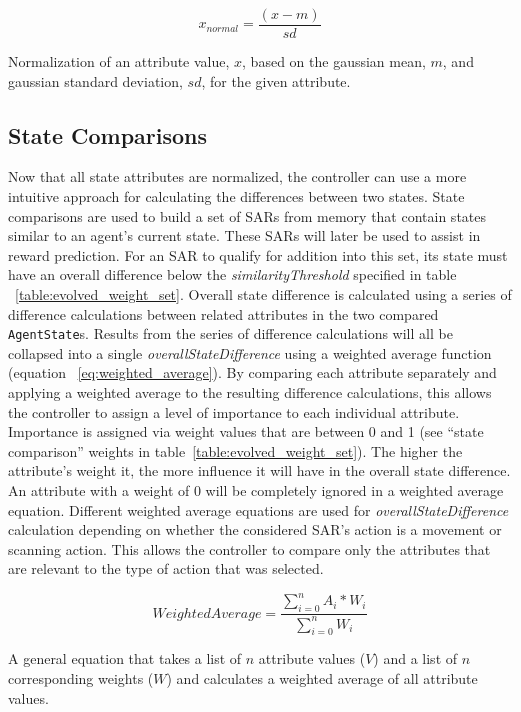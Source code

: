 \begin{capeq}
  \begin{equation} \label{eq:gaussian_normalize}
    x_{normal} = \frac{(x - m)}{sd}
  \end{equation}
  \caption{Normalization of an attribute value, $x$, based on the gaussian mean, $m$, and gaussian standard deviation, $sd$, for the given attribute.}
\end{capeq}



\subsection{State Comparisons} \label{subsec:state_comparisons}
Now that all state attributes are normalized, the controller can use a more intuitive approach for calculating the differences between two states.
State comparisons are used to build a set of SARs from memory that contain states similar to an agent's current state.
These SARs will later be used to assist in reward prediction.
For an SAR to qualify for addition into this set, its state must have an overall difference below the \textit{similarityThreshold} specified in table ~\ref{table:evolved_weight_set}.
Overall state difference is calculated using a series of difference calculations between related attributes in the two compared \texttt{AgentState}s.
Results from the series of difference calculations will all be collapsed into a single \textit{overallStateDifference} using a weighted average function (equation ~\ref{eq:weighted_average}).
By comparing each attribute separately and applying a weighted average to the resulting difference calculations, this allows the controller to assign a level of importance to each individual attribute.
Importance is assigned via weight values that are between 0 and 1 (see ``state comparison'' weights in table~\ref{table:evolved_weight_set}).
The higher the attribute's weight it, the more influence it will have in the overall state difference.
An attribute with a weight of 0 will be completely ignored in a weighted average equation.
Different weighted average equations are used for \textit{overallStateDifference} calculation depending on whether the considered SAR's action is a movement or scanning action.
This allows the controller to compare only the attributes that are relevant to the type of action that was selected.

\begin{capeq}
  \begin{equation} \label{eq:weighted_average}
    WeightedAverage = \frac{\sum_{i=0}^{n} A_{i} * W_{i}}{\sum_{i=0}^{n} W_{i}}
  \end{equation}
  \caption{A general equation that takes a list of $n$ attribute values ($V$) and a list of $n$ corresponding weights ($W$) and calculates a weighted average of all attribute values.}
\end{capeq}


